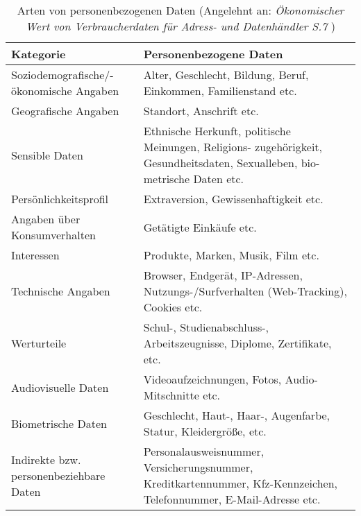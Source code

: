 \begingroup
\begin{table}[!ht]
\renewcommand{\arraystretch}{1.5} %
\begin{tabularx}{\textwidth}{| X | X |}
\hline
\rowcolor[rgb]{0.737,0.839,0.862}
\textbf{Kategorie} & \textbf{Personenbezogene Daten} \\
\hline
Soziodemografische/-ökonomische Angaben & Alter, Geschlecht, Bildung, Beruf, Einkommen, Familienstand etc. \\
\hline
Geografische Angaben & Standort, Anschrift etc. \\
\hline
Sensible Daten & Ethnische  Herkunft,  politische  Meinungen, Religions-
zugehörigkeit,  Gesundheitsdaten,  Sexualleben,  bio-
metrische Daten etc. \\ 
\hline
Persönlichkeitsprofil & Extraversion, Gewissenhaftigkeit etc. \\
\hline
Angaben über Konsumverhalten & Getätigte Einkäufe etc. \\
\hline
Interessen & Produkte, Marken, Musik, Film etc. \\
\hline
Technische Angaben & Browser, Endgerät, IP-Adressen, Nutzungs-/Surfverhalten (Web-Tracking), Cookies etc. \\
\hline
Werturteile & Schul-, Studienabschluss-, Arbeitszeugnisse, Diplome, Zertifikate, etc. \\
\hline
Audiovisuelle Daten & Videoaufzeichnungen, Fotos, Audio-Mitschnitte etc. \\
\hline
Biometrische Daten & Geschlecht, Haut-, Haar-, Augenfarbe, Statur, Kleidergröße, etc. \\
\hline
Indirekte bzw. personenbeziehbare Daten & Personalausweisnummer, Versicherungsnummer, Kreditkartennummer, Kfz-Kennzeichen, Telefonnummer, E-Mail-Adresse etc. \\
\hline
\end{tabularx}
\caption{Arten von personenbezogenen Daten (Angelehnt an: \textit{Ökonomischer Wert von Verbraucherdaten für Adress- und Datenhändler S.7} \cite{Wert_der_Daten_2017})}
\label{tab:personenbezogeneDaten}
\end{table}
\endgroup


